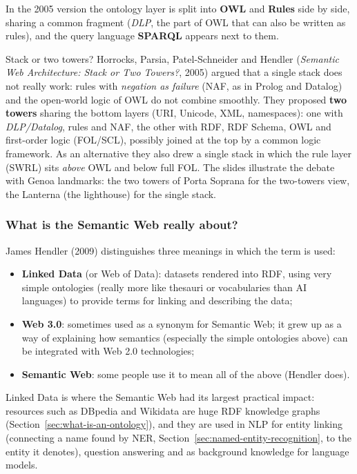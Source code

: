 In the 2005 version the ontology layer is split into \textbf{OWL} and \textbf{Rules}
side by side, sharing a common fragment (\emph{DLP}, the part of OWL that can also be
written as rules), and the query language \textbf{SPARQL} appears next to them.

\begin{nbfact}{Stack or two towers?}
Horrocks, Parsia, Patel-Schneider and Hendler (\emph{Semantic Web Architecture: Stack or
Two Towers?}, 2005) argued that a single stack does not really work: rules with
\emph{negation as failure} (NAF, as in Prolog and Datalog) and the open-world logic of
OWL do not combine smoothly. They proposed \textbf{two towers} sharing the bottom layers
(URI, Unicode, XML, namespaces): one with \emph{DLP/Datalog}, rules and NAF, the other
with RDF, RDF Schema, OWL and first-order logic (FOL/SCL), possibly joined at the top by
a common logic framework. As an alternative they also drew a single stack in which the
rule layer (SWRL) sits \emph{above} OWL and below full FOL. The slides illustrate the
debate with Genoa landmarks: the two towers of Porta Soprana for the two-towers view,
the Lanterna (the lighthouse) for the single stack.
\end{nbfact}

\subsubsection{What is the Semantic Web really about?}

James Hendler (2009) distinguishes three meanings in which the term is used:
\begin{itemize}[nosep]
  \item \textbf{Linked Data} (or Web of Data): datasets rendered into RDF, using very
        simple ontologies (really more like thesauri or vocabularies than AI languages)
        to provide terms for linking and describing the data;
  \item \textbf{Web 3.0}: sometimes used as a synonym for Semantic Web; it grew up as a
        way of explaining how semantics (especially the simple ontologies above) can be
        integrated with Web 2.0 technologies;
  \item \textbf{Semantic Web}: some people use it to mean all of the above (Hendler
        does).
\end{itemize}

\begin{nbwhy}
Linked Data is where the Semantic Web had its largest practical impact: resources such
as DBpedia and Wikidata are huge RDF knowledge graphs (Section~\ref{sec:what-is-an-ontology}),
and they are used in NLP for entity linking (connecting a name found by NER,
Section~\ref{sec:named-entity-recognition}, to the entity it denotes), question answering
and as background knowledge for language models.
\end{nbwhy}

